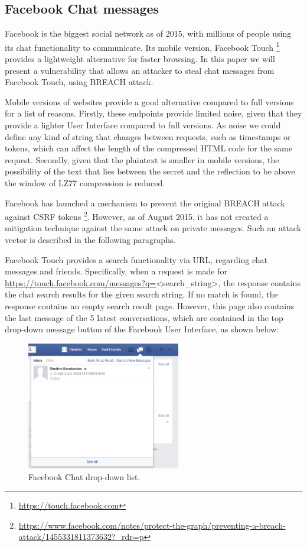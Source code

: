 \subsection{Facebook Chat messages}\label{subsec:fb}

Facebook is the biggest social network as of 2015, with millions of people using
its chat functionality to communicate. Its mobile version, Facebook Touch
\footnote{\url{https://touch.facebook.com}} provides a lightweight alternative
for faster browsing. In this paper we will present a vulnerability that allows
    an attacker to steal chat messages from Facebook Touch, using BREACH attack.

Mobile versions of websites provide a good alternative compared to full versions
for a list of reasons. Firstly, these endpoints provide limited noise, given
    that they provide a lighter User Interface compared to full versions. As
    noise we could define any kind of string that changes between requests, such
    as timestamps or tokens, which can affect the length of the compressed HTML
    code for the same request. Secondly, given that the plaintext is smaller in
    mobile versions, the possibility of the text that lies between the secret
    and the reflection to be above the window of LZ77 compression is reduced.

Facebook has launched a mechanism to prevent the original BREACH attack against
CSRF tokens
\footnote{\url{https://www.facebook.com/notes/protect-the-graph/preventing-a-breach-attack/1455331811373632?_rdr=p}}.
However, as of August 2015, it has not created a mitigation technique against
the same attack on private messages. Such an attack vector is described in the
following paragraphs.

Facebook Touch provides a search functionality via URL, regarding chat messages
and friends. Specifically, when a request is made for
\url{https://touch.facebook.com/messages?q=}<search\_string>, the response
contains the chat search results for the given search string. If no match is
found, the response contains an empty search result page. However, this page
also contains the last message of the 5 latest conversations, which are
contained in the top drop-down message button of the Facebook User Interface, as
shown below:

\begin{figure}[H] \caption{Facebook Chat drop-down list.} \centering
\includegraphics[width=0.6\textwidth]{diagrams/fb_message.png}\end{figure}

